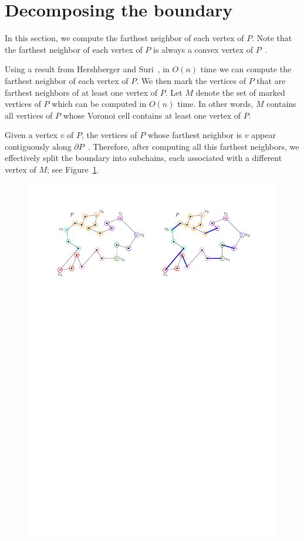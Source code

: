 \documentclass[a4paper,UKenglish]{lipics}
\begin{document}
\section{Decomposing the boundary}\label{Section:Decomposing the boundary}
In this section, we compute the farthest neighbor of each vertex of $P$. 
Note that the farthest neighbor of each vertex of $P$ is always a convex vertex of $P$~\cite{at-cgcsp-85}.

Using a result from Hershberger and Suri~\cite{hershberger1993matrix}, in $O(n)$ time we can compute the farthest neighbor of each vertex of $P$.
We then mark the vertices of $P$ that are farthest neighbors of at least one vertex of $P$.
Let $M$ denote the set of marked vertices of $P$ which can be computed in $O(n)$ time.
In other words, $M$ contains all vertices of $P$ whose Voronoi cell contains at least one vertex of $P$.

Given a vertex $v$ of $P$, the vertices of $P$ whose farthest neighbor is $v$ appear contiguously along $\partial P$~\cite{aronov1993furthest}. Therefore, after computing all this farthest neighbors, we effectively split the boundary into subchains, each associated with a different vertex of $M$; see Figure~\ref{fig:Marked vertices decomposition}.

\begin{figure}[tb]
\centering
\includegraphics[width=1\textwidth]{img/MarkedVertices.pdf}
\caption{\small }
\label{fig:Marked vertices decomposition}
\end{figure}
\end{document}

